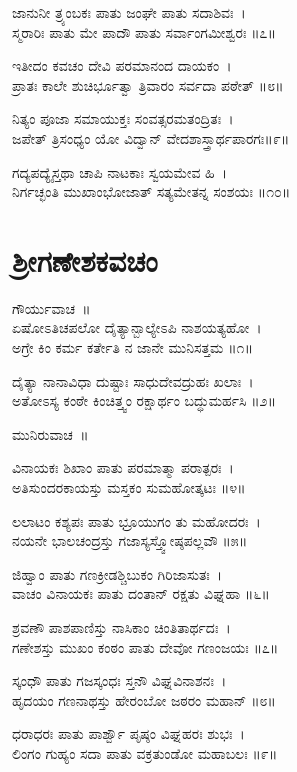 ಜಾನುನೀ ತ್ರ್ಯಂಬಕಃ ಪಾತು ಜಂಘೇ ಪಾತು ಸದಾಶಿವಃ~।\\
ಸ್ಮರಾರಿಃ ಪಾತು ಮೇ ಪಾದೌ ಪಾತು ಸರ್ವಾಂಗಮೀಶ್ವರಃ ॥೭॥

ಇತೀದಂ ಕವಚಂ ದೇವಿ ಪರಮಾನಂದ ದಾಯಕಂ~।\\
ಪ್ರಾತಃ ಕಾಲೇ ಶುಚಿರ್ಭೂತ್ವಾ ತ್ರಿವಾರಂ ಸರ್ವದಾ ಪಠೇತ್ ॥೮॥

ನಿತ್ಯಂ ಪೂಜಾ ಸಮಾಯುಕ್ತಃ ಸಂವತ್ಸರಮತಂದ್ರಿತಃ~।\\
ಜಪೇತ್ ತ್ರಿಸಂಧ್ಯಂ ಯೋ ವಿದ್ವಾನ್ ವೇದಶಾಸ್ತ್ರಾರ್ಥಪಾರಗಃ॥೯॥

ಗದ್ಯಪದ್ಯೈಸ್ತಥಾ ಚಾಪಿ ನಾಟಕಾಃ ಸ್ವಯಮೇವ ಹಿ~।\\
ನಿರ್ಗಚ್ಛಂತಿ ಮುಖಾಂಭೋಜಾತ್ ಸತ್ಯಮೇತನ್ನ ಸಂಶಯಃ ॥೧೦॥
\section{ಶ್ರೀಗಣೇಶಕವಚಂ }
ಗೌರ್ಯುವಾಚ~॥\\
ಏಷೋಽತಿಚಪಲೋ ದೈತ್ಯಾನ್ಬಾಲ್ಯೇಽಪಿ ನಾಶಯತ್ಯಹೋ~।\\
ಅಗ್ರೇ ಕಿಂ ಕರ್ಮ ಕರ್ತೇತಿ ನ ಜಾನೇ ಮುನಿಸತ್ತಮ ॥೧॥

ದೈತ್ಯಾ ನಾನಾವಿಧಾ ದುಷ್ಟಾಃ ಸಾಧುದೇವದ್ರುಹಃ ಖಲಾಃ~।\\
ಅತೋಽಸ್ಯ ಕಂಠೇ ಕಿಂಚಿತ್ತ್ವಂ ರಕ್ಷಾರ್ಥಂ ಬದ್ಧುಮರ್ಹಸಿ ॥೨॥

ಮುನಿರುವಾಚ~॥\\

ವಿನಾಯಕಃ ಶಿಖಾಂ ಪಾತು ಪರಮಾತ್ಮಾ ಪರಾತ್ಪರಃ~।\\
ಅತಿಸುಂದರಕಾಯಸ್ತು ಮಸ್ತಕಂ ಸುಮಹೋತ್ಕಟಃ ॥೪॥

ಲಲಾಟಂ ಕಶ್ಯಪಃ ಪಾತು ಭ್ರೂಯುಗಂ ತು ಮಹೋದರಃ~।\\
ನಯನೇ ಭಾಲಚಂದ್ರಸ್ತು ಗಜಾಸ್ಯಸ್ತ್ವೋಷ್ಠಪಲ್ಲವೌ ॥೫॥

ಜಿಹ್ವಾಂ ಪಾತು ಗಣಕ್ರೀಡಶ್ಚಿಬುಕಂ ಗಿರಿಜಾಸುತಃ~।\\
ವಾಚಂ ವಿನಾಯಕಃ ಪಾತು ದಂತಾನ್ ರಕ್ಷತು ವಿಘ್ನಹಾ ॥೬॥

ಶ್ರವಣೌ ಪಾಶಪಾಣಿಸ್ತು ನಾಸಿಕಾಂ ಚಿಂತಿತಾರ್ಥದಃ~।\\
ಗಣೇಶಸ್ತು ಮುಖಂ ಕಂಠಂ ಪಾತು ದೇವೋ ಗಣಂಜಯಃ ॥೭॥

ಸ್ಕಂಧೌ ಪಾತು ಗಜಸ್ಕಂಧಃ ಸ್ತನೌ ವಿಘ್ನವಿನಾಶನಃ~।\\
ಹೃದಯಂ ಗಣನಾಥಸ್ತು ಹೇರಂಬೋ ಜಠರಂ ಮಹಾನ್ ॥೮॥

ಧರಾಧರಃ ಪಾತು ಪಾರ್ಶ್ವೌ ಪೃಷ್ಠಂ ವಿಘ್ನಹರಃ ಶುಭಃ~।\\
ಲಿಂಗಂ ಗುಹ್ಯಂ ಸದಾ ಪಾತು ವಕ್ರತುಂಡೋ ಮಹಾಬಲಃ ॥೯॥

